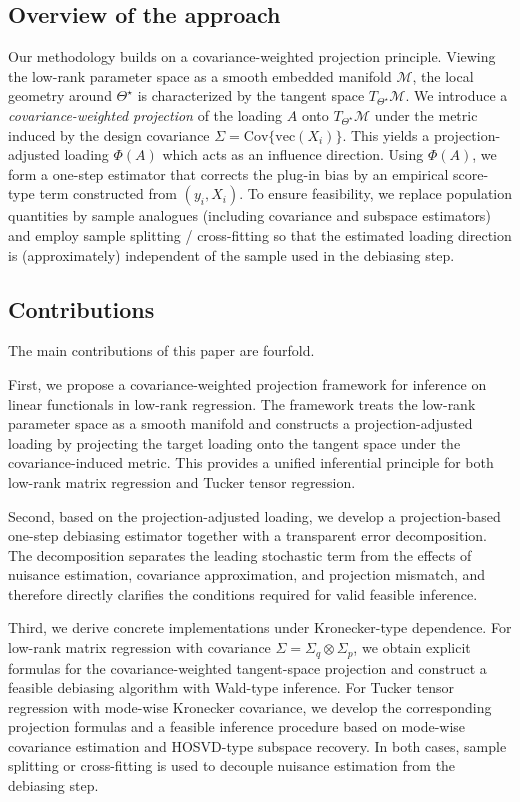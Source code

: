 \documentclass[authoryear,preprint,review,12pt]{elsarticle}
\begin{document}
	\subsection{Overview of the approach}
	Our methodology builds on a covariance-weighted projection principle.
	Viewing the low-rank parameter space as a smooth embedded manifold $\mathcal{M}$, the local geometry
	around $\Theta^\star$ is characterized by the tangent space $T_{\Theta^\star}\mathcal{M}$.
	We introduce a \emph{covariance-weighted projection} of the loading $A$ onto $T_{\Theta^\star}\mathcal{M}$
	under the metric induced by the design covariance
	$\Sigma=\mathrm{Cov}\{\mathrm{vec}(X_i)\}$.
	This yields a projection-adjusted loading $\Phi(A)$ which acts as an influence direction.
	Using $\Phi(A)$, we form a one-step estimator that corrects the plug-in bias by an empirical score-type
	term constructed from $(y_i,X_i)$.
	To ensure feasibility, we replace population quantities by sample analogues (including covariance and
	subspace estimators) and employ sample splitting / cross-fitting so that the estimated loading direction
	is (approximately) independent of the sample used in the debiasing step.
	
	\subsection{Contributions} 
	
	The main contributions of this paper are fourfold.
	
	First, we propose a covariance-weighted projection framework for inference on linear functionals in low-rank regression. The framework treats the low-rank parameter space as a smooth manifold and constructs a projection-adjusted loading by projecting the target loading onto the tangent space under the covariance-induced metric. This provides a unified inferential principle for both low-rank matrix regression and Tucker tensor regression.
	
	Second, based on the projection-adjusted loading, we develop a projection-based one-step debiasing estimator together with a transparent error decomposition. The decomposition separates the leading stochastic term from the effects of nuisance estimation, covariance approximation, and projection mismatch, and therefore directly clarifies the conditions required for valid feasible inference.
	
	Third, we derive concrete implementations under Kronecker-type dependence. For low-rank matrix regression with covariance \(\Sigma=\Sigma_q\otimes\Sigma_p\), we obtain explicit formulas for the covariance-weighted tangent-space projection and construct a feasible debiasing algorithm with Wald-type inference. For Tucker tensor regression with mode-wise Kronecker covariance, we develop the corresponding projection formulas and a feasible inference procedure based on mode-wise covariance estimation and HOSVD-type subspace recovery. In both cases, sample splitting or cross-fitting is used to decouple nuisance estimation from the debiasing step.
	
\end{document}
